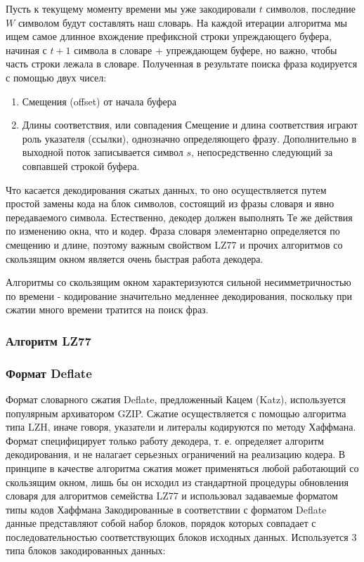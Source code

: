 \documentclass[12pt]{article}
\begin{document}
Пусть к текущему моменту времени мы уже закодировали $t$ символов, последние $W$ символом будут
составлять наш словарь. На каждой итерации алгоритма мы ищем самое длинное вхождение префиксной
строки упреждающего буфера, начиная с $t+1$ символа в словаре + упреждающем буфере,
но важно, чтобы часть строки лежала в словаре. Полученная в результате поиска фраза
кодируется с помощью двух чисел:

\begin{enumerate}
    \item Смещения (offset) от начала буфера
    \item Длины соответствия, или совпадения
          Смещение и длина соответствия играют роль указателя (ссылки),
          однозначно определяющего фразу.
          Дополнительно в выходной поток записывается символ $s$,
          непосредственно следующий за совпавшей строкой буфера.

\end{enumerate}

Что касается декодирования сжатых данных, то оно осуществляется путем простой
замены кода на блок символов, состоящий из фразы словаря и явно передаваемого символа.
Естественно, декодер должен выполнять Те же действия по изменению окна,
что и кодер. Фраза словаря элементарно определяется по смещению и длине,
поэтому важным свойством LZ77 и прочих алгоритмов со скользящим окном является очень
быстрая работа декодера.

Алгоритмы со скользящим окном характеризуются сильной несимметричностью по времени - кодирование значительно медленнее декодирования,
поскольку при сжатии много времени тратится на поиск фраз.

\subsubsection{Алгоритм LZ77}

\subsubsection{Формат Deflate}

Формат словарного сжатия Deflate, предложенный Кацем (Katz),
используется популярным архиватором GZIP.
Сжатие осуществляется с помощью алгоритма типа LZH, иначе говоря,
указатели и литералы кодируются по методу Хаффмана.
Формат специфицирует только работу декодера, т. е. определяет алгоритм декодирования,
и не налагает серьезных ограничений на реализацию кодера. В принципе в качестве алгоритма сжатия может применяться любой работающий со скользящим окном, лишь бы он исходил из стандартной процедуры обновления словаря для алгоритмов семейства LZ77 и использовал задаваемые форматом типы кодов Хаффмана
Закодированные в соответствии с форматом Deflate данные представляют собой набор блоков,
порядок которых совпадает с последовательностью соответствующих блоков исходных данных.
Используется 3 типа блоков закодированных данных:
\end{document}
